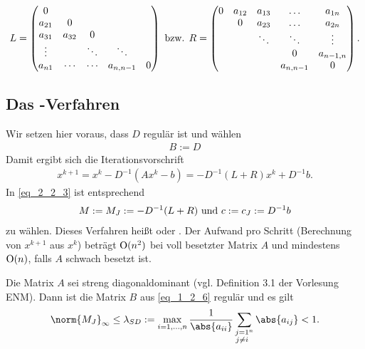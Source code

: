 \begin{align}
	L = 
	\begin{pmatrix}
		0      &        &        &           & \\
		a_{21} & 0      &        &           & \\
		a_{31} & a_{32} & 0      &           & \\
		\vdots &        & \ddots & \ddots    & \\
		a_{n1} & \cdots & \cdots & a_{n,n-1} & 0
	\end{pmatrix}
	 \text{ bzw. } R = 
	 \begin{pmatrix}
	 0      & a_{12} & a_{13} & \dots     & a_{1n}\\
	        & 0      & a_{23} & \dots     & a_{2n}\\
	        &        & \ddots & \ddots    & \vdots\\
	        &        &        & 0         & a_{n-1,n}\\
	        &        &        & a_{n,n-1} & 0
	 \end{pmatrix}.\notag
\end{align}

\subsection{Das -Verfahren}
Wir setzen hier voraus, dass $D$ regulär ist und wählen
\begin{align}
	B:= D \label{eq_1_2_6}
\end{align}
Damit ergibt sich die Iterationsvorschrift
\begin{align}
	x^{k+1} = x^k - D^{-1}(Ax^k - b) = -D^{-1}(L+R)x^k+D^{-1}b. \label{eq_1_2_7}
\end{align}
In \cref{eq_2_2_3} ist entsprechend
\begin{align}
	M:= M_J := -D^{-1}(L+R) \text{ und } c:= c_J := D^{-1}b\notag 
\end{align}
zu wählen. Dieses Verfahren heißt  oder . Der Aufwand pro Schritt (Berechnung von $x^{k+1}$ aus $x^k$) beträgt $\operatorname{O}(n^2)$ bei voll besetzter Matrix $A$ und mindestens $\operatorname{O}(n)$, falls $A$ schwach besetzt ist.

\begin{proposition}
	Die Matrix $A$ sei streng diagonaldominant (vgl. Definition 3.1 der Vorlesung ENM). Dann ist die Matrix $B$ aus \cref{eq_1_2_6} regulär und es gilt
	\begin{align}
	\norm{M_J}_{\infty} \le \lambda_{SD} := \max_{i = 1,\dots,n} \frac{1}{\abs{a_{ii}}} \sum_{\substack{j =1 \\ j\neq i}^{n}} \abs{a_{ij}} < 1. \notag
	\end{align}
\end{proposition}


